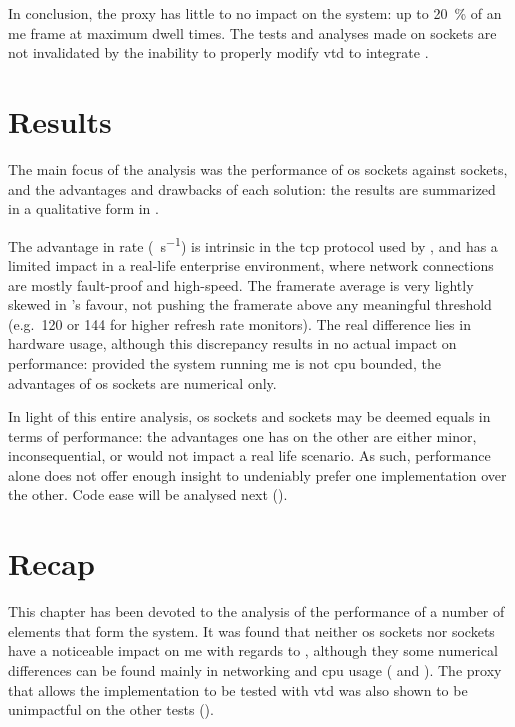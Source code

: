 In conclusion, the \gls{proxy} has little to no impact on the system: up to \SI{20}{\percent} of an \gls{me} frame at maximum dwell times. The tests and analyses made on  sockets are not invalidated by the inability to properly modify \gls{vtd} to integrate .

\section{Results}\label{sc:performance:results}

The main focus of the analysis was the performance of \gls{os} sockets against  sockets, and the advantages and drawbacks of each solution: the results are summarized in a qualitative form in .



The advantage in rate (\si{\packets\per\second}) is intrinsic in the \gls{tcp} protocol used by , and has a limited impact in a real-life enterprise environment, where network connections are mostly fault-proof and high-speed. The \gls{framerate} average is very lightly skewed in 's favour, not pushing the \gls{framerate} above any meaningful threshold (e.g.\ \SI{120}{\fps} or \SI{144}{\fps} for higher refresh rate monitors). The real difference lies in hardware usage, although this discrepancy results in no actual impact on performance: provided the system running \gls{me} is not \gls{cpu} bounded, the advantages of \gls{os} sockets are numerical only.

In light of this entire analysis, \gls{os} sockets and  sockets may be deemed equals in terms of performance: the advantages one has on the other are either minor, inconsequential, or would not impact a real life scenario. As such, performance alone does not offer enough insight to undeniably prefer one implementation over the other. Code ease will be analysed next ().

\section{Recap}\label{sc:performance:recap}

This chapter has been devoted to the analysis of the performance of a number of elements that form the system. It was found that neither \gls{os} sockets nor  sockets have a noticeable impact on \gls{me} with regards to , although they some numerical differences can be found mainly in networking and \gls{cpu} usage ( and ). The proxy that allows the  implementation to be tested with \gls{vtd} was also shown to be unimpactful on the other tests ().
